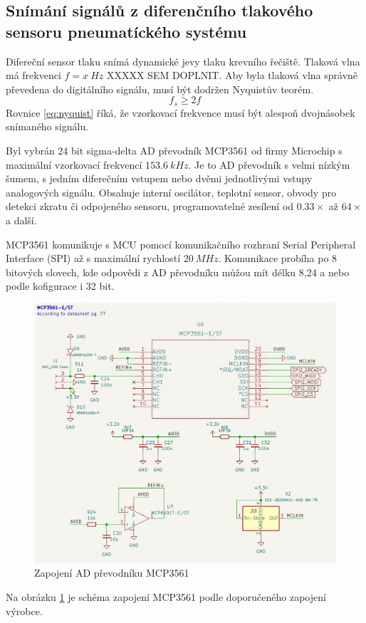 \subsection{Snímání signálů z diferenčního tlakového sensoru pneumatíckého systému}
Difereční sensor tlaku snímá dynamické jevy tlaku krevního řečiště. Tlaková vlna má frekvenci $f = x \ Hz$ XXXXX SEM DOPLNIT. Aby byla tlaková vlna správně převedena do digitálního signálu, musí být dodržen Nyquistův teorém.
\begin{equation} \label{eq:nyquist}
    f_s \geq 2f
\end{equation}
Rovnice \ref{eq:nyquist} říká, že vzorkovací frekvence musí být alespoň dvojnásobek snímaného signálu.
\par
Byl vybrán 24 bit sigma-delta AD převodník MCP3561 od firmy Microchip s maximální vzorkovací frekvencí $153.6 \ kHz$. Je to AD převodník s velmi nízkým šumem, s jedním diferečním vstupem nebo dvěmi jednotlivými vstupy analogových signálu.
Obsahuje interní oscilátor, teplotní sensor, obvody pro detekci zkratu či odpojeného sensoru, programovatelné zesílení od $0.33 \times$ až $64 \times$ a další.
\par
MCP3561 komunikuje s MCU pomocí komunikačního rozhraní Serial Peripheral Interface (SPI) až s maximální rychlostí $20 \ MHz$. Komunikace probíha po 8 bitových slovech, kde odpovědi z AD převodníku můžou mít délku 8,24 a nebo podle kofigurace i 32 bit.
\begin{figure}[H]
    \centering
    \caption{Zapojení AD převodníku MCP3561}
    \label{fig:mcp3561_connection}
    \includegraphics[width=1\linewidth]{pictures/mcp3561_connection.jpg}
\end{figure}
Na obrázku \ref{fig:mcp3561_connection} je schéma zapojení MCP3561 podle doporučeného zapojení výrobce.
